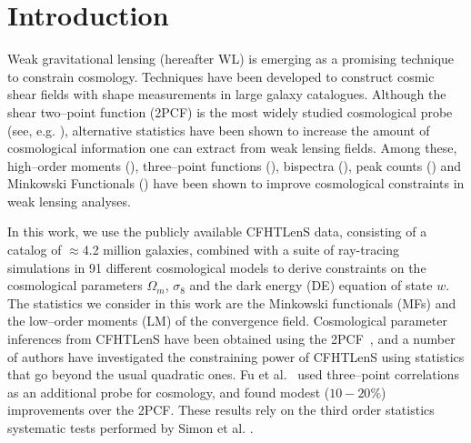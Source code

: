 \documentclass[reprint,aps,prd,superscriptaddress,showkeys,showpacs]{revtex4-1}
\begin{document}

\maketitle



\section{Introduction}

Weak gravitational lensing (hereafter WL) is emerging as a promising
technique to constrain cosmology. Techniques have been developed to
construct cosmic shear fields with shape measurements in large galaxy
catalogues. Although the shear two--point function (2PCF) is the most
widely studied cosmological probe (see, e.g. \citep{CFHTKilbinger}),
alternative statistics have been shown to increase the amount of
cosmological information one can extract from weak lensing
fields. Among these, high--order moments
(\citep{moments1,moments2,moments3,moments4,moments5}),
three--point functions (\citep{3pcf1,3pcf2,3pcf3}), bispectra
(\citep{bispectrum1,bispectrum2,bispectrum3,bispectrum4}), peak counts
(\citep{peaks1,peaks2,peaks3,peaks4,peaks5,peaks6,peaks7,peaks8}) and Minkowski
Functionals (\citep{MinkJan,Petri2013}) have been shown to improve
cosmological constraints in weak lensing analyses.

In this work, we use the publicly available CFHTLenS data, consisting
of a catalog of $\approx$4.2 million galaxies, combined with a suite
of ray-tracing simulations in 91 different cosmological models to
derive constraints on the cosmological parameters $\Omega_m$,
$\sigma_8$ and the dark energy (DE) equation of state $w$.  The
statistics we consider in this work are the Minkowski functionals
(MFs) and the low--order moments (LM) of the convergence field.
Cosmological parameter inferences from CFHTLenS have been obtained
using the 2PCF~\citep{CFHTKilbinger}, and a number of authors have
investigated the constraining power of CFHTLenS using statistics that
go beyond the usual quadratic ones. Fu et al.~\citep{CFHTFu} used
three--point correlations as an additional probe for cosmology, and
found modest ($10-20\%$) improvements over the 2PCF. These results rely on the third order statistics systematic tests performed by Simon et al. \citep{CFHTSimon}.  
\end{document}
